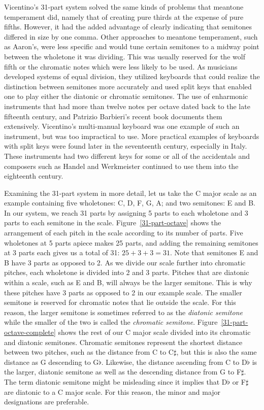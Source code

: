Vicentino's 31-part system solved the same kinds of problems that meantone temperament
did, namely that of creating pure thirds at the expense of pure fifths. However, it had
the added advantage of clearly indicating that semitones differed in size by one comma.
Other approaches to meantone temperament, such as Aaron's, were less specific and would
tune certain semitones to a midway point between the wholetone it was dividing.  This
was usually reserved for the wolf fifth or the chromatic notes which were less likely
to be used.  As musicians developed systems of equal division, they utilized keyboards
that could realize the distinction between semitones more accurately and used split
keys that enabled one to play either the diatonic or chromatic semitones.  The use of
enharmonic instruments that had more than twelve notes per octave dated back to the
late fifteenth century, and Patrizio Barbieri's recent book documents them
extensively.\autocite{PB:1} Vicentino's multi-manual keyboard was one example of such
an instrument, but was too impractical to use. More practical examples of keyboards
with split keys were found later in the seventeenth century, especially in Italy. These
instruments had two different keys for some or all of the accidentals and composers
such as Handel and Werkmeister continued to use them into the eighteenth century.
\autocite[108]{MB:1}

Examining the 31-part system in more detail, let us take the C major scale as an
example containing five wholetones: C, D, F, G, A; and two semitones: E and B. In our
system, we reach 31 parts by assigning 5 parts to each wholetone and 3 parts to each
semitone in the scale.  Figure~\ref{31-part-octave} shows the arrangement of each pitch
in the scale according to its number of parts. 
Five wholetones at 5 parts apiece makes 25 parts, and adding the remaining semitones at
3 parts each gives us a total of 31: $ 25 + 3 + 3 = 31 $. Note that semitones E and B
have 3 parts as opposed to 2.  As we divide our scale further into chromatic pitches,
each wholetone is divided into 2 and 3 parts.  Pitches that are diatonic within a
scale, such as E and B, will always be the larger semitone.  This is why these pitches
have 3 parts as opposed to 2 in our example scale.  The smaller semitone is reserved
for chromatic notes that lie outside the scale. For this reason, the larger semitone is
sometimes referred to as the \textit{diatonic semitone} while the smaller of the two is
called the \textit{chromatic semitone}. Figure~\ref{31-part-octave-complete} shows the
rest of our C major scale divided into its chromatic and diatonic semitones.
 Chromatic semitones represent the
shortest distance between two pitches, such as the distance from C to C$\sharp$, but
this is also the same distance as G descending to G$\flat$.  Likewise, the distance
ascending from C to D$\flat$ is the larger, diatonic semitone as well as the descending
distance from G to F$\sharp$. The term diatonic semitone might be misleading since it
implies that D$\flat$ or F$\sharp$ are diatonic to a C major scale.  For this reason,
the minor and major designations are preferable.

